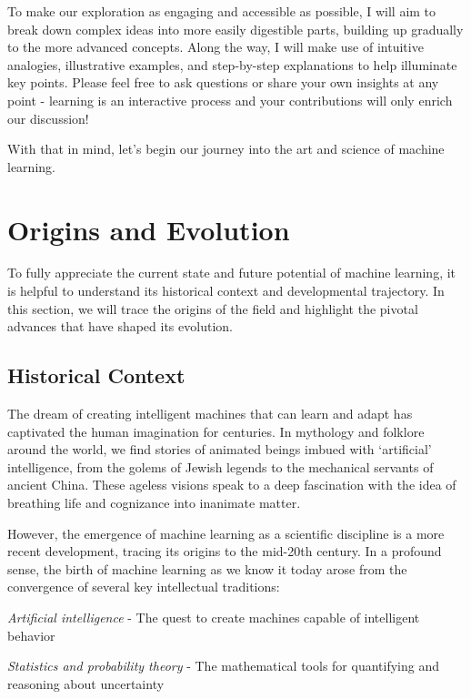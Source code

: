 \documentclass[
  9pt,
  letterpaper,
  abstract,
  titlepage]{scrbook}
\begin{document}
To make our exploration as engaging and accessible as possible, I will
aim to break down complex ideas into more easily digestible parts,
building up gradually to the more advanced concepts. Along the way, I
will make use of intuitive analogies, illustrative examples, and
step-by-step explanations to help illuminate key points. Please feel
free to ask questions or share your own insights at any point - learning
is an interactive process and your contributions will only enrich our
discussion!

With that in mind, let's begin our journey into the art and science of
machine learning.

\section{Origins and Evolution}\label{origins-and-evolution}

To fully appreciate the current state and future potential of machine
learning, it is helpful to understand its historical context and
developmental trajectory. In this section, we will trace the origins of
the field and highlight the pivotal advances that have shaped its
evolution.

\subsection{Historical Context}\label{historical-context}

The dream of creating intelligent machines that can learn and adapt has
captivated the human imagination for centuries. In mythology and
folklore around the world, we find stories of animated beings imbued
with `artificial' intelligence, from the golems of Jewish legends to the
mechanical servants of ancient China. These ageless visions speak to a
deep fascination with the idea of breathing life and cognizance into
inanimate matter.

However, the emergence of machine learning as a scientific discipline is
a more recent development, tracing its origins to the mid-20th century.
In a profound sense, the birth of machine learning as we know it today
arose from the convergence of several key intellectual traditions:

\emph{Artificial intelligence} - The quest to create machines capable of
intelligent behavior

\emph{Statistics and probability theory} - The mathematical tools for
quantifying and reasoning about uncertainty
\end{document}
